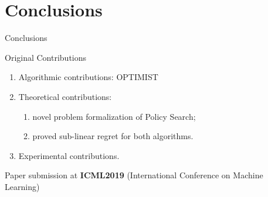 \section{Conclusions}


\begin{frame}{Conclusions}
	
	\begin{block}{Original Contributions}

	\begin{enumerate}
		\item<+-|alert@+> Algorithmic contributions: OPTIMIST
		\item<+-|alert@+> Theoretical contributions:
		\begin{enumerate}
			\item<+-|alert@+> novel problem formalization of Policy Search;
			\item<+-|alert@+> proved sub-linear regret for both algorithms.
		\end{enumerate}
		\item<+-|alert@+> Experimental contributions.
	\end{enumerate}
	\onslide<+-> Paper submission at \textbf{ICML2019} (International Conference on Machine Learning)
	\end{block}
	
	
\end{frame}